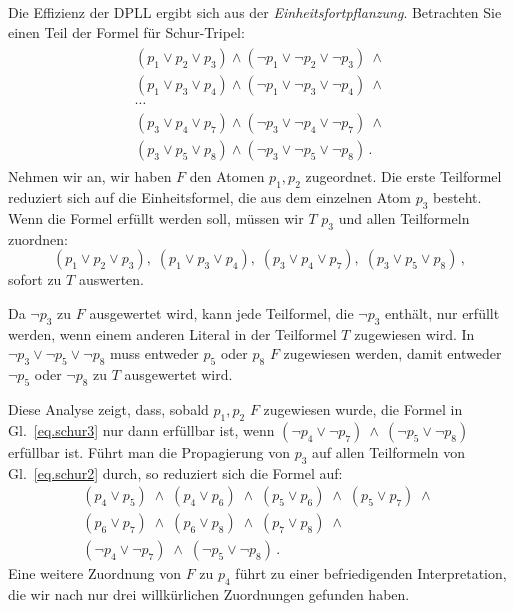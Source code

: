 Die Effizienz der DPLL ergibt sich aus der \emph{Einheitsfortpflanzung}. Betrachten Sie einen Teil der Formel für Schur-Tripel:
\begin{align}
\begin{array}{l}\label{eq.schur3}
(p_1 \vee p_2 \vee p_3) \wedge (\neg p_1 \vee \neg p_2 \vee \neg p_3) \:\wedge \\
(p_1 \vee p_3 \vee p_4) \wedge (\neg p_1 \vee \neg p_3 \vee \neg p_4) \:\wedge \\
\cdots\\
(p_3 \vee p_4 \vee p_7) \wedge (\neg p_3 \vee \neg p_4 \vee \neg p_7) \:\wedge \\
(p_3 \vee p_5 \vee p_8) \wedge (\neg p_3 \vee \neg p_5 \vee \neg p_8)\,.
\end{array}
\end{align}
Nehmen wir an, wir haben $F$ den Atomen $p_1,p_2$ zugeordnet. Die erste Teilformel reduziert sich auf die Einheitsformel, die aus dem einzelnen Atom $p_3$ besteht. Wenn die Formel erfüllt werden soll, müssen wir $T$ $p_3$ und allen Teilformeln zuordnen:
\[
(p_1 \vee p_2 \vee p_3),\;(p_1 \vee p_3 \vee p_4),\;
(p_3 \vee p_4 \vee p_7),\;(p_3 \vee p_5 \vee p_8)\,,
\]
sofort zu $T$ auswerten.

Da $\neg p_3$ zu $F$ ausgewertet wird, kann jede Teilformel, die $\neg p_3$ enthält, nur erfüllt werden, wenn einem anderen Literal in der Teilformel $T$ zugewiesen wird. In $\neg p_3 \vee \neg p_5 \vee \neg p_8$ muss entweder $p_5$ oder $p_8$ $F$ zugewiesen werden, damit entweder $\neg p_5$ oder $\neg p_8$ zu $T$ ausgewertet wird.

Diese Analyse zeigt, dass, sobald $p_1,p_2$ $F$ zugewiesen wurde, die Formel in Gl.~\ref{eq.schur3} nur dann erfüllbar ist, wenn $(\neg p_4 \vee \neg p_7) \:\wedge\: (\neg p_5 \vee \neg p_8)$ erfüllbar ist. Führt man die Propagierung von $p_3$ auf allen Teilformeln von Gl.~\ref{eq.schur2} durch, so reduziert sich die Formel auf:
\[
\begin{array}{l}
(p_4\vee p_5)\;\wedge\;(p_4\vee p_6)\;\wedge\;(p_5\vee p_6)\;\wedge\;(p_5\vee p_7)\;\wedge\;\\
(p_6\vee p_7)\;\wedge\;(p_6\vee p_8)\;\wedge\;(p_7\vee p_8)\;\wedge\\
(\neg p_4\vee \neg p_7)\;\wedge\;
(\neg p_5\vee \neg p_8)\,.
\end{array}
\]
Eine weitere Zuordnung von $F$ zu $p_4$ führt zu einer befriedigenden Interpretation, die wir nach nur drei willkürlichen Zuordnungen gefunden haben.

